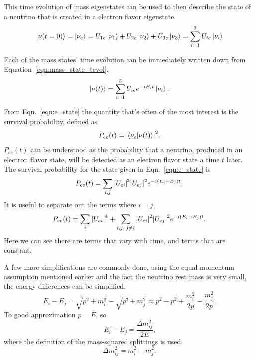 This time evolution of mass eigenstates can be used to then describe the state
of a neutrino that is created in a electron flavor eigenstate.
\begin{equation}
\ket{\nu(t=0)} = \ket{\nu_{e}} = U_{1e}\ket{\nu_1} + U_{2e}\ket{\nu_{2}} + U_{3e}\ket{\nu_{3}}
    =\sum_{i=1}^{3}U_{ie}\ket{\nu_{i}}
\end{equation}

Each of the mass states' time evolution can be immediately written down from
Equation~\eqref{eqn:mass_state_tevol},
\begin{equation}
    \ket{\nu(t)} = \sum_{i=1}^{3} U_{ie}e^{-iE_{i}t}\ket{\nu_{i}}\text{.}
    \label{eqn:e_state}
\end{equation}

From Eqn.~\eqref{eqn:e_state} the quantity that's often of the most interest
is the survival probability, defined as
\begin{equation}
    P_{ee}(t) = \abs{\braket{\nu_{e}}{\nu(t)}}^{2}\text{.}
\end{equation}
$P_{ee}(t)$ can be understood as the probability that a neutrino, produced in
an electron flavor state, will be detected as an electron flavor state a time
$t$ later.
The survival probability for the state given in Eqn.~\eqref{eqn:e_state} is
\begin{equation}
    P_{ee}(t) = \sum_{i,j}\abs{U_{ei}}^2\abs{U_{ej}}^2e^{-i(E_{i} - E_{j})t}\text{.}
\end{equation}
It is useful to separate out the terms where $i=j$,
\begin{equation}
    P_{ee}(t) = \sum_{i}\abs{U_{ei}}^4 + \sum_{i,j\text{, }j \ne i}
    \abs{U_{ei}}^2\abs{U_{ej}}^2e^{-i(E_{i} - E_{j})t}\text{.}
\end{equation}
Here we can see there are terms that vary with time, and terms that are
constant.

A few more simplifications are commonly done, using the equal momentum
assumption mentioned earlier and the fact the neutrino rest mass is
very small, the energy differences can be simplified,
\begin{equation}
    E_{i} - E_{j} = \sqrt{p^{2} + m_{i}^{2}} - \sqrt{p^{2} + m_{j}^{2}} \approx
    p^{2} - p^{2} + \frac{m_{i}^2}{2p} - \frac{m_{j}^2}{2p}\text{.}
\end{equation}
To good approximation $p=E$, so
\begin{equation}
    E_{i} - E_{j} = \frac{\Delta m^{2}_{ij}}{2E}\text{,}
\end{equation}
where the definition of the mass-squared splittings is used,
\begin{equation}
    \Delta m^{2}_{ij} = m^{2}_{i} - m^{2}_{j}\text{.}
\end{equation}

